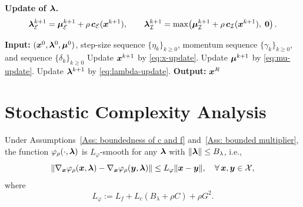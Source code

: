 \documentclass[10pt]{article}
\newcommand{\calE}{\mathcal{E}}
\newcommand{\calI}{\mathcal{I}}
\begin{document}
\textbf{Update of $\bm{\lambda}$.}
\begin{equation}\label{eq:lambda-update}
    \blmbd_{\calE}^{k+1} = \bmu_{\calE}^{k+1} + \rho\,\bc_{\calE}(\bx^{k+1}),
    \qquad
    \blmbd_{\calI}^{k+1} = \max\!\left(\bmu_{\calI}^{k+1} + \rho\,\bc_{\calI}(\bx^{k+1}),\;\bm{0}\right).
\end{equation}


\begin{algorithm}[H]
    \caption{Perturbed Linearized ALM}
    \label{alg:PLADM-eq}
    \small
    \begin{algorithmic}[1]
        \STATE \textbf{Input:} $(\bm{x}^0, \bm{\lambda}^0, \bm{\mu}^0)$, 
        step-size sequence $\{\eta_k\}_{k\geq 0}$, momentum sequence $\{\gamma_k\}_{k\geq 0}$,
        and sequence $\{\delta_k\}_{k\geq 0}$
            \STATE Update $\bm{x}^{k+1}$ by \eqref{eq:x-update}.
            \STATE Update $\bm{\mu}^{k+1}$ by \eqref{eq:mu-update}.
            \STATE Update $\bm{\lambda}^{k+1}$ by \eqref{eq:lambda-update}.
        \ENDFOR
        \STATE \textbf{Output:} $\bm{x}^R$ 
    \end{algorithmic}
\end{algorithm}
\section{Stochastic Complexity Analysis}
\label{sec:analysis}
\begin{lemma}
\label{lem:phi-smooth}
Under Assumptions~\ref{Ass: boundedness of c and f} 
and~\ref{Ass: bounded multiplier}, the function 
$\varphi_{\rho}(\cdot,\bm{\lambda})$ is $L_{\varphi}$-smooth for any 
$\bm{\lambda}$ with $\|\bm{\lambda}\|\leq B_{\lambda}$, i.e.,
\begin{equation}\label{eq:phi-smooth}
    \|\nabla_{\bm{x}}\varphi_{\rho}(\bm{x},\bm{\lambda})
     - \nabla_{\bm{x}}\varphi_{\rho}(\bm{y},\bm{\lambda})\|
    \leq L_{\varphi}\|\bm{x}-\bm{y}\|,
    \quad \forall\,\bm{x},\bm{y}\in\mathcal{X},
\end{equation}
where
\begin{equation}\label{eq:Lphi-def}
    L_{\varphi} := L_f + L_c(B_{\lambda}+\rho C) + \rho G^2.
\end{equation}
\end{lemma}
\end{document}

